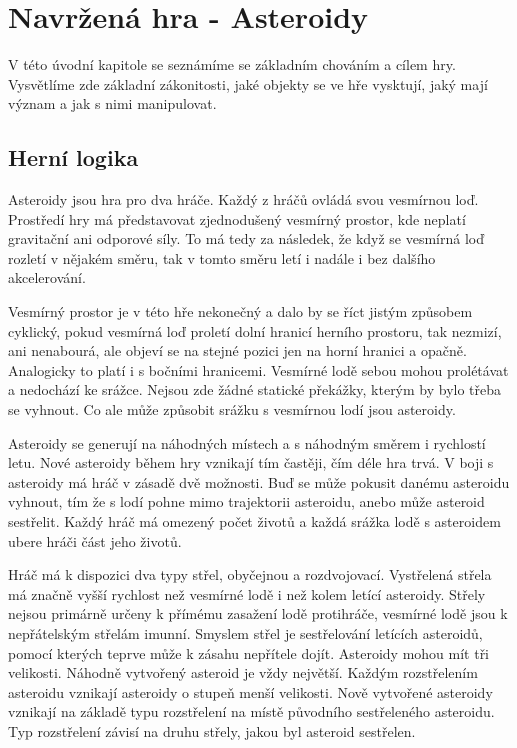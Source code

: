\chapter{Navržená hra - Asteroidy}
V této úvodní kapitole se seznámíme se základním chováním a cílem hry. 
Vysvětlíme zde základní zákonitosti, jaké objekty se ve hře vysktují, jaký mají význam a jak s nimi manipulovat.

\section{Herní logika}
Asteroidy jsou hra pro dva hráče. 
Každý z hráčů ovládá svou vesmírnou loď.
Prostředí hry má představovat zjednodušený vesmírný prostor, kde neplatí gravitační ani odporové síly.
To má tedy za následek, že když se vesmírná loď rozletí v nějakém směru, tak v tomto směru letí i nadále i bez dalšího akcelerování.
\par
\label{HraniceProsotru}
Vesmírný prostor je v této hře nekonečný a dalo by se říct jistým způsobem cyklický, pokud vesmírná loď proletí dolní hranicí herního prostoru, tak nezmizí, ani nenabourá, ale objeví se na stejné pozici jen na horní hranici a opačně. Analogicky to platí i s bočními hranicemi.
Vesmírné lodě sebou mohou prolétávat a nedochází ke srážce.
Nejsou zde žádné statické překážky, kterým by bylo třeba se vyhnout. Co ale může způsobit srážku s vesmírnou lodí jsou asteroidy.    
\par
Asteroidy se generují na náhodných místech a s náhodným směrem i rychlostí letu. Nové asteroidy během hry vznikají tím častěji, čím déle hra trvá.
V boji s asteroidy má hráč v zásadě dvě možnosti. Buď se může pokusit danému asteroidu vyhnout, tím že s lodí pohne mimo trajektorii asteroidu, anebo může asteroid sestřelit.
Každý hráč má omezený počet životů a každá srážka lodě s asteroidem ubere hráči část jeho životů.
\par
Hráč má k dispozici dva typy střel, obyčejnou a rozdvojovací. Vystřelená střela má značně vyšší rychlost než vesmírné lodě i než kolem letící asteroidy.
Střely nejsou primárně určeny k přímému zasažení lodě protihráče, vesmírné lodě jsou k nepřátelským střelám imunní.
Smyslem střel je sestřelování letících asteroidů, pomocí kterých teprve může k zásahu nepřítele dojít. Asteroidy mohou mít tři velikosti. Náhodně vytvořený asteroid je vždy největší. Každým rozstřelením asteroidu vznikají asteroidy o stupeň menší velikosti.
Nově vytvořené asteroidy vznikají na základě typu rozstřelení na místě původního sestřeleného asteroidu. Typ rozstřelení závisí na druhu střely, jakou byl asteroid sestřelen. 

